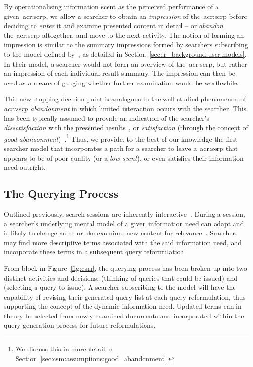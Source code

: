By operationalising information scent as the perceived performance of a given~\gls{acr:serp}, we allow a searcher to obtain an \emph{impression} of the~\gls{acr:serp} before deciding to \emph{enter} it and examine presented content in detail -- or \emph{abandon} the~\gls{acr:serp} altogether, and move to the next activity. The notion of forming an impression is similar to the summary impressions formed by searchers subscribing to the model defined by~\cite{thomas2014modelling_behaviour}, as detailed in Section~\ref{sec:ir_background:user:models}. In their model, a searcher would not form an overview of the~\gls{acr:serp}, but rather an impression of each individual result summary. The impression can then be used as a means of gauging whether further examination would be worthwhile.

This new stopping decision point is analogous to the well-studied phenomenon of \emph{\gls{acr:serp} abandonment} in which limited interaction occurs with the searcher. This has been typically assumed to provide an indication of the searcher's \emph{dissatisfaction} with the presented results~\citep{dassarma2008serp_abandonment, chuklin2012serp_abandonment, kiseleva2015serp_fails}, or \emph{satisfaction} (through the concept of \emph{good abandonment})~\citep{loumakis2011image_smells, wu2014information_scent}.\footnote{We discuss this in more detail in Section~\ref{sec:csm:assumptions:good_abandonment}.} Thus, we provide, to the best of our knowledge the first searcher model that incorporates a path for a searcher to leave a~\gls{acr:serp} that appears to be of poor quality (or a \emph{low scent}), or even satisfies their information need outright.

\subsection{The Querying Process}\label{sec:csm:advancements:querying}
Outlined previously, search sessions are inherently interactive~\citep{ingwersen2005theturn}. During a session, a searcher's underlying mental model of a given information need can adapt and is likely to change as he or she examines new content for relevance~\citep{borlund2003iir_model}. Searchers may find more descriptive terms associated with the said information need, and incorporate these terms in a subsequent query reformulation.

From block  in Figure~\ref{fig:csm}, the querying process has been broken up into two distinct activities and decisions:  (thinking of queries that could be issued) and  (selecting a query to issue). A searcher subscribing to the model will have the capability of revising their generated query list at each query reformulation, thus supporting the concept of the dynamic information need. Updated terms can in theory be selected from newly examined documents and incorporated within the query generation process for future reformulations.

